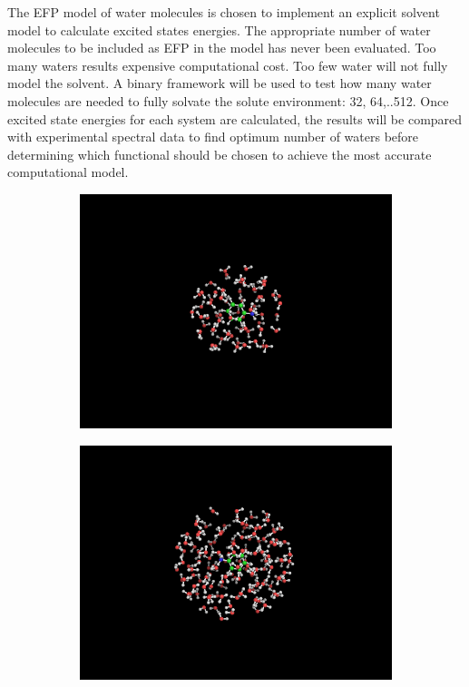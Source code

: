 \documentclass[
journal=jpcbfk, %
manuscript=article]{achemso}
\begin{document}
The EFP model of water molecules is chosen to implement an explicit solvent model to calculate excited states energies. The appropriate number of water molecules to be included as EFP in the model has never been evaluated. Too many waters results expensive computational cost. Too few water will not fully model the solvent. A binary framework will be used to test how many water molecules are needed to fully solvate the solute environment: 32, 64,..512. Once excited state energies for each system are calculated, the results will be compared with experimental spectral data to find optimum number of waters before determining which functional should be chosen to achieve the most accurate computational model. 
\begin{figure}[!tbp]
	\centering
	\label{fig:startingGeometryAniline}
	\begin{subfigure}[b]{0.4\textwidth}
		\includegraphics[width=1\textwidth]{startingGeometry/aniline64.png}
		\caption{}
		\label{fig:startingGeometryAnilinea)}
	\end{subfigure}
	\hfill
	\begin{subfigure}[b]{0.4\textwidth}
		\includegraphics[width=1\textwidth]{startingGeometry/aniline128.png}

\end{subfigure}
\end{figure}
\end{document}
